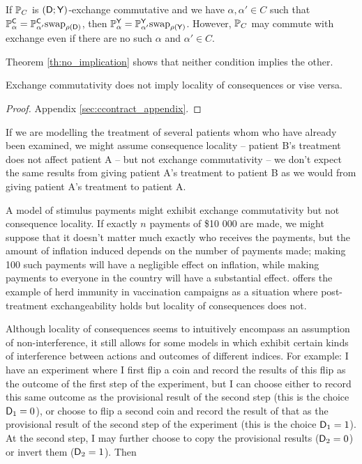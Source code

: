 If $\mathbb{P}_C$ is $(\mathsf{D};\mathsf{Y})$-exchange commutative and we have $\alpha,\alpha'\in C$ such that $\mathbb{P}_\alpha^{\mathsf{C}} = \mathbb{P}_{\alpha'}^{\mathsf{C}}\text{swap}_{\rho(\mathsf{D})}$, then $\mathbb{P}_\alpha^{\mathsf{Y}} = \mathbb{P}_{\alpha'}^{\mathsf{Y}}\text{swap}_{\rho(\mathsf{Y})}$. However, $\mathbb{P}_C$ may commute with exchange even if there are no such $\alpha$ and $\alpha'\in C$.

Theorem \ref{th:no_implication} shows that neither condition implies the other. 

\begin{theorem}\label{th:no_implication}
Exchange commutativity does not imply locality of consequences or vise versa.
\end{theorem}

\begin{proof}
Appendix \ref{sec:ccontract_appendix}.
\end{proof}

If we are modelling the treatment of several patients whom who have already been examined, we might assume consequence locality -- patient B's treatment does not affect patient A -- but not exchange commutativity -- we don't expect the same results from giving patient A's treatment to patient B as we would from giving patient A's treatment to patient A. 

A model of stimulus payments might exhibit exchange commutativity but not consequence locality. If exactly $n$ payments of \$10 000 are made, we might suppose that it doesn't matter much exactly who receives the payments, but the amount of inflation induced depends on the number of payments made; making 100 such payments will have a negligible effect on inflation, while making payments to everyone in the country will have a substantial effect. \citet{dawid_causal_2000} offers the example of herd immunity in vaccination campaigns as a situation where post-treatment exchangeability holds but locality of consequences does not.

Although locality of consequences seems to intuitively encompass an assumption of non-interference, it still allows for some models in which exhibit certain kinds of interference between actions and outcomes of different indices. For example: I have an experiment where I first flip a coin and record the results of this flip as the outcome of the first step of the experiment, but I can choose either to record this same outcome as the provisional result of the second step (this is the choice $\mathsf{D}_1=0$), or choose to flip a second coin and record the result of that as the provisional result of the second step of the experiment (this is the choice $\mathsf{D}_1=1$). At the second step, I may further choose to copy the provisional results ($\mathsf{D}_2=0$) or invert them ($\mathsf{D}_2=1$). Then

